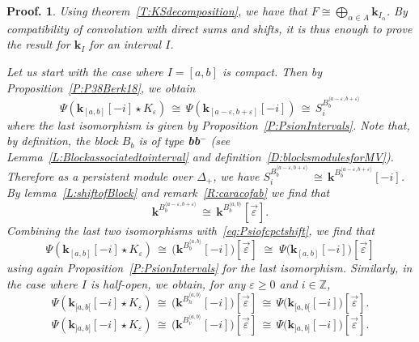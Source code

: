 \documentclass[a4paper, english, 11pt]{article}
\newcommand{\kk}[0]{\textbf{k}}
\newcommand{\0}{\vec{0}}
\newtheorem*{pf}{Proof.} }
\begin{document}
\begin{pf}
 Using theorem~\ref{T:KSdecomposition}, we have that $F\cong \bigoplus_{\alpha \in A} \kk_{I_\alpha} $. By compatibility of convolution with direct sums and shifts, it is thus enough to prove the result for $\kk_I$ for an interval $I$. 
 
Let us start with the case where $I= [a,b]$ is compact.    Then by Proposition~\ref{P:P38Berk18}, we obtain 
\begin{equation}\label{eq:Psiofcpctshift}
 \Psi(\kk_{[a,b]}[-i] \star K_{\varepsilon}) \,\cong\,  \Psi(\kk_{[a-\varepsilon,b+\varepsilon]}[-i])
 \, \cong \, S_i^{B_{b}^{\langle a-\varepsilon, b +\varepsilon\rangle}}
\end{equation}
where the last isomorphism is given by Proposition~\ref{P:PsionIntervals}. Note that, by definition, the block $B_b$ is of type \textbf{bb}$^{-}$ (see Lemma~\ref{L:Blockassociatedtointerval} and definition~\ref{D:blocksmodulesforMV}). Therefore as a persistent module over $\Delta_+$, we have 
$S_i^{B_{b}^{\langle a-\varepsilon, b +\varepsilon\rangle}} \,\cong\, \kk^{B_{b}^{\langle a-\varepsilon, b+\varepsilon \rangle}} [-i]$. By lemma~\ref{L:shiftofBlock} and remark~\ref{R:caracofab} we find that 
$$\kk^{B_{b}^{\langle a-\varepsilon, b+\varepsilon \rangle}} \, \cong \, \kk^{B_{b}^{\langle a, b\rangle}}[\vec{\varepsilon}]. $$
Combining the last two isomorphisms with~\eqref{eq:Psiofcpctshift}, we find that 
\begin{equation}
 \Psi(\kk_{[a,b]}[-i] \star K_{\varepsilon}) \,\cong\, \Big(\kk^{B_{b}^{\langle a, b\rangle}}[-i]\Big)[\vec{\varepsilon}] \; \cong \;  \Psi\big(\kk_{[a,b]}[-i]\big)[\vec{\varepsilon}]
\end{equation}
using again Proposition~\ref{P:PsionIntervals} for the last isomorphism.
Similarly, in the case where $I$ is half-open, we obtain, for any $\varepsilon\geq 0$ and $i\in \mathbb{Z}$, 
\begin{equation}
 \Psi(\kk_{[a,b[} [-i] \star K_{\varepsilon}) \,\cong \, \Big(\kk^{B_{h}^{\langle a, b\rangle}}[-i]\Big)[\vec{\varepsilon}] \, \cong\, \Psi\big(\kk_{[a,b[} [-i]\big)[\vec{\varepsilon}] .
 \end{equation}
 \begin{equation}
 \Psi(\kk_{]a,b]} [-i] \star K_{\varepsilon})  \,\cong \, \Big(\kk^{B_{v}^{\langle a, b\rangle}}[-i]\Big)[\vec{\varepsilon}] \, \cong\,\Psi\big(\kk_{]a,b]} [-i]\big)[\vec{\varepsilon}].
\end{equation}



\end{pf}
\end{document}
